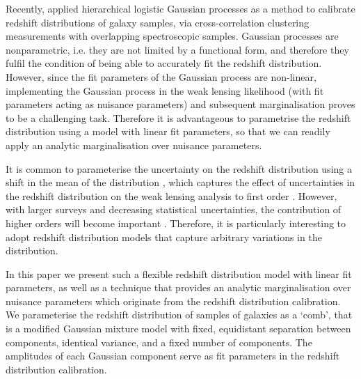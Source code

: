 \documentclass{aa}
\begin{document}
 Recently, \cite{2020MNRAS.491.4768R} applied hierarchical logistic Gaussian processes as a method to calibrate redshift distributions of galaxy samples, via cross-correlation clustering measurements with overlapping spectroscopic samples. Gaussian processes are nonparametric, i.e. they are not limited by a functional form, and therefore they fulfil the condition of being able to accurately fit the redshift distribution. However, since the fit parameters of the Gaussian process are non-linear, implementing the Gaussian process in the weak lensing likelihood (with fit parameters acting as nuisance parameters) and subsequent marginalisation proves to be a challenging task. Therefore it is advantageous to parametrise the redshift distribution using a model with linear fit parameters, so that we can readily apply an analytic marginalisation over nuisance parameters.
 
It is common to parameterise the uncertainty on the redshift distribution using a shift in the mean of the distribution \citep{hildebrandt18, hildebrandt20, HSC2, DES3, hoyle18}, which captures the effect of uncertainties in the redshift distribution on the weak lensing analysis to first order \citep{amara}. However, with larger surveys and decreasing statistical uncertainties, the contribution of higher orders will become important \citep{wright_som}. Therefore, it is particularly interesting to adopt redshift distribution models that capture arbitrary variations in the distribution.

In this paper we present such a flexible redshift distribution model with linear fit parameters, as well as a technique that provides an analytic marginalisation over nuisance parameters which originate from the redshift distribution calibration. We parameterise the redshift distribution of samples of galaxies as a `comb', that is a modified Gaussian mixture model with fixed, equidistant separation between components, identical variance, and a fixed number of components. The amplitudes of each Gaussian component serve as fit parameters in the redshift distribution calibration. 
\end{document}
